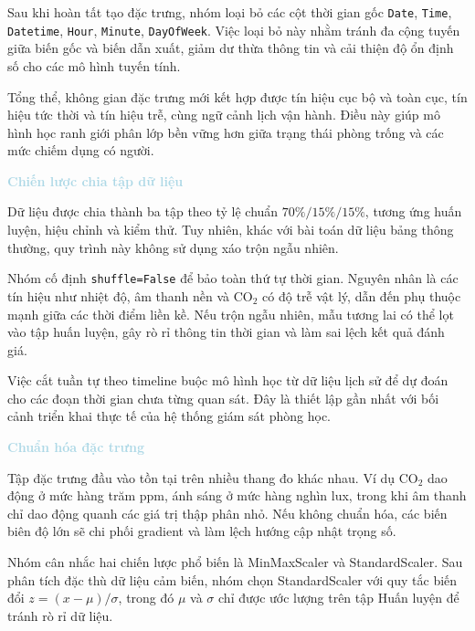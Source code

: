 Sau khi hoàn tất tạo đặc trưng, nhóm loại bỏ các cột thời gian gốc \texttt{Date}, \texttt{Time}, \texttt{Datetime}, \texttt{Hour}, \texttt{Minute}, \texttt{DayOfWeek}. Việc loại bỏ này nhằm tránh đa cộng tuyến giữa biến gốc và biến dẫn xuất, giảm dư thừa thông tin và cải thiện độ ổn định số cho các mô hình tuyến tính.

Tổng thể, không gian đặc trưng mới kết hợp được tín hiệu cục bộ và toàn cục, tín hiệu tức thời và tín hiệu trễ, cùng ngữ cảnh lịch vận hành. Điều này giúp mô hình học ranh giới phân lớp bền vững hơn giữa trạng thái phòng trống và các mức chiếm dụng có người.

\vspace{0.5em}
\noindent\textcolor{lightblue}{\textbf{Chiến lược chia tập dữ liệu}}
\vspace{0.5em}

Dữ liệu được chia thành ba tập theo tỷ lệ chuẩn $70\%/15\%/15\%$, tương ứng huấn luyện, hiệu chỉnh và kiểm thử. Tuy nhiên, khác với bài toán dữ liệu bảng thông thường, quy trình này không sử dụng xáo trộn ngẫu nhiên.

Nhóm cố định \texttt{shuffle=False} để bảo toàn thứ tự thời gian. Nguyên nhân là các tín hiệu như nhiệt độ, âm thanh nền và CO$_2$ có độ trễ vật lý, dẫn đến phụ thuộc mạnh giữa các thời điểm liền kề. Nếu trộn ngẫu nhiên, mẫu tương lai có thể lọt vào tập huấn luyện, gây rò rỉ thông tin thời gian và làm sai lệch kết quả đánh giá.

Việc cắt tuần tự theo timeline buộc mô hình học từ dữ liệu lịch sử để dự đoán cho các đoạn thời gian chưa từng quan sát. Đây là thiết lập gần nhất với bối cảnh triển khai thực tế của hệ thống giám sát phòng học.

\vspace{0.5em}
\noindent\textcolor{lightblue}{\textbf{Chuẩn hóa đặc trưng}}
\vspace{0.5em}

Tập đặc trưng đầu vào tồn tại trên nhiều thang đo khác nhau. Ví dụ CO$_2$ dao động ở mức hàng trăm ppm, ánh sáng ở mức hàng nghìn lux, trong khi âm thanh chỉ dao động quanh các giá trị thập phân nhỏ. Nếu không chuẩn hóa, các biến biên độ lớn sẽ chi phối gradient và làm lệch hướng cập nhật trọng số.

Nhóm cân nhắc hai chiến lược phổ biến là MinMaxScaler và StandardScaler. Sau phân tích đặc thù dữ liệu cảm biến, nhóm chọn StandardScaler với quy tắc biến đổi $z=(x-\mu)/\sigma$, trong đó $\mu$ và $\sigma$ chỉ được ước lượng trên tập Huấn luyện để tránh rò rỉ dữ liệu.


